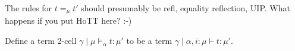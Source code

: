 \documentclass[10pt]{article}
\newcommand{\yields}{\vdash}
\newcommand\TermTwoT[5]{\ensuremath{#1 \mid #3 \vDash_{#5} #2 : #4}}
\newcommand\TrPlus[2]{\ensuremath{#1^+(#2)}}
\begin{document}
\begin{enumerate}
The rules for $t =_\mu t'$ should presumably be refl, equality
reflection, UIP.  What happens if you put HoTT here?  :-)

Define a term 2-cell $\TermTwoT{\gamma}{t}{\mu}{\mu'}{\alpha}$ to be a
term $\gamma \mid \alpha,i:\mu \yields t : \mu'$.  

\end{enumerate}








\end{document}
